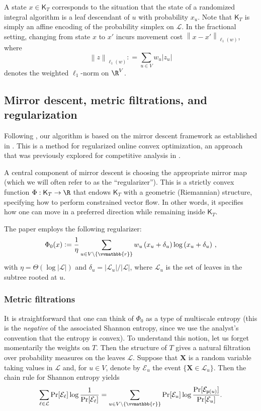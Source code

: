 \documentclass{toc}
\newcommand{\calE}{\mathcal E}
\newcommand{\calL}{\mathcal L}
\newcommand{\vvr}{\vvmathbb{r}}
\newcommand{\seteq}{\mathrel{\mathop:}=}
\newcommand{\sfp}{\mathsf{p}}
\newcommand{\sfK}{\mathsf K}
\newcommand{\tnorm}[1]{\left\|#1\right\|_{\ell_1(w)}}
\begin{document}
A state $x\in\sfK_T$ corresponds to the situation that the state of a randomized integral algorithm is a leaf descendant of $u$ with probability $x_u$. Note that $\sfK_T$ is simply an affine encoding of the probability simplex on $\calL$. In the fractional setting, changing from state $x$ to $x'$ incurs movement cost $\tnorm{x-x'}$, where
\[
\tnorm{z} \seteq \sum_{u \in V} w_u |z_u|
\]
denotes the weighted $\ell_1$-norm on $\R^{V}$.

\subsection{Mirror descent, metric filtrations, and regularization}

Following \cite{BCLL19}, our algorithm is based on the mirror descent framework as established in \cite{BCLLM18}.
This is a method for regularized online convex optimization,
an approach that was previously explored for competitive analysis in \cite{ABBS10,BCN14}.

A central component of mirror descent is choosing the appropriate mirror map
(which we will often refer to as the ``regularizer'').  This is a strictly convex function
$\Phi : \sfK_T \to \R$ that endows $\sfK_T$ with a geometric (Riemannian) structure,
specifying how to perform constrained vector flow.  In other words,
it specifies how one can move in a preferred direction while remaining inside $\sfK_T$.

The paper \cite{BCLL19} employs the following regularizer:
\begin{equation}\label{eq:reg0}
\Phi_0(x) \seteq \frac{1}{\eta} \sum_{u \in V \setminus \{\vvr\}} w_u \left(x_u+\delta_u\right) \log \left(x_u+\delta_u\right)\,,
\end{equation}
with $\eta =\Theta(\log |\calL|)$ and $\delta_u = |\calL_u|/|\calL|$, where $\calL_u$ is the set of leaves in the subtree rooted at $u$.

\subsubsection{Metric filtrations}
It is straightforward that one can think of $\Phi_0$ as a type of multiscale entropy (this is the
\emph{negative} of the associated Shannon entropy, since we use the analyst's convention
that the entropy is convex).
To understand this notion, let us forget momentarily the weights on $T$.  Then
the structure of $T$ gives a natural filtration over probability measures on the leaves $\calL$.
Suppose that $\bm{X}$ is a random variable taking values in $\calL$ and,
for $u \in V$, denote by $\calE_u$ the event $\{\bm{X} \in \calL_u\}$.
Then the chain rule for Shannon entropy yields
\[
\sum_{\ell\in\calL} \Pr[\calE_\ell]\log \frac{1}{\Pr[\calE_{\ell}]} = 
\sum_{u\in V\setminus\{\vvr\}}
\Pr[\calE_u] \log \frac{\Pr[\calE_{\sfp(u)}]}{\Pr[\calE_u]}.
\]
\end{document}
